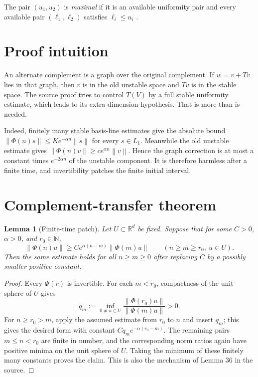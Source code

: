 \documentclass[11pt]{article}
\newtheorem{lemma}{Lemma}
\theoremstyle{definition}
\newcommand{\R}{\mathbb R}
\newcommand{\N}{\mathbb N}
\newcommand{\Phiop}{\Phi}
\newcommand{\norm}[1]{\left\lVert #1\right\rVert}
\begin{document}
The pair $(u_1,u_2)$ is \emph{maximal} if it is an available uniformity pair
and every available pair $(\ell_1,\ell_2)$ satisfies
$\ell_i\le u_i$ \cite[Definition 35]{CKS}.

\section{Proof intuition}

An alternate complement is a graph over the original complement.  If
$w=v+Tv$ lies in that graph, then $v$ is in the old unstable space and $Tv$
is in the stable space.  The source proof tries to control $T(V)$ by a full
stable uniformity estimate, which leads to its extra dimension hypothesis.
That is more than is needed.

Indeed, finitely many stable basis-line estimates give the absolute bound
$\norm{\Phiop(n)s}\le K e^{-\alpha n}\norm{s}$ for every $s\in L_1$.
Meanwhile the old unstable estimate gives
$\norm{\Phiop(n)v}\ge c e^{\alpha n}\norm v$.  Hence the graph correction is
at most a constant times $e^{-2\alpha n}$ of the unstable component.  It is
therefore harmless after a finite time, and invertibility patches the finite
initial interval.

\section{Complement-transfer theorem}

\begin{lemma}[Finite-time patch]\label{lem:patch}
Let $U\subset\R^d$ be fixed.  Suppose that for some $C>0$, $\alpha>0$, and
$r_0\in\N$,
\[
 \norm{\Phiop(n)u}\ge C e^{\alpha(n-m)}\norm{\Phiop(m)u}
 \qquad(n\ge m\ge r_0,\ u\in U).
\]
Then the same estimate holds for all $n\ge m\ge0$ after replacing $C$ by a
possibly smaller positive constant.
\end{lemma}

\begin{proof}
Every $\Phiop(r)$ is invertible.  For each $m<r_0$, compactness of the unit
sphere of $U$ gives
\[
 q_m:=\inf_{0\ne u\in U}
 \frac{\norm{\Phiop(r_0)u}}{\norm{\Phiop(m)u}}>0.
\]
For $n\ge r_0>m$, apply the assumed estimate from $r_0$ to $n$ and insert
$q_m$; this gives the desired form with constant
$Cq_m e^{-\alpha(r_0-m)}$.  The remaining pairs $m\le n<r_0$ are finite in
number, and the corresponding norm ratios again have positive minima on the
unit sphere of $U$.  Taking the minimum of these finitely many constants
proves the claim.  This is also the mechanism of Lemma 36 in the source.
\end{proof}
\end{document}
